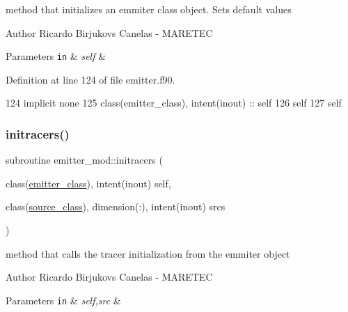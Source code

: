 method that initializes an emmiter class object. Sets default values 

\begin{DoxyAuthor}{Author}
Ricardo Birjukovs Canelas -\/ M\+A\+R\+E\+T\+EC
\end{DoxyAuthor}

\begin{DoxyParams}[1]{Parameters}
\mbox{\tt in}  & {\em self} & \\
\hline
\end{DoxyParams}


Definition at line 124 of file emitter.\+f90.


\begin{DoxyCode}
124     \textcolor{keywordtype}{implicit none}
125     \textcolor{keywordtype}{class}(emitter\_class), \textcolor{keywordtype}{intent(inout)} :: self
126     self%
127     self%
\end{DoxyCode}
\mbox{\label{namespaceemitter__mod_ad89dfc083eae7362441c353225a74ebc}} 
\subsubsection{\texorpdfstring{initracers()}{initracers()}}
{\footnotesize\ttfamily subroutine emitter\+\_\+mod\+::initracers (\begin{DoxyParamCaption}\item[{class(\mbox{\hyperlink{structemitter__mod_1_1emitter__class}{emitter\+\_\+class}}), intent(inout)}]{self,  }\item[{class(\mbox{\hyperlink{structsources__mod_1_1source__class}{source\+\_\+class}}), dimension(\+:), intent(inout)}]{srcs }\end{DoxyParamCaption})\hspace{0.3cm}{\ttfamily [private]}}



method that calls the tracer initialization from the emmiter object 

\begin{DoxyAuthor}{Author}
Ricardo Birjukovs Canelas -\/ M\+A\+R\+E\+T\+EC
\end{DoxyAuthor}

\begin{DoxyParams}[1]{Parameters}
\mbox{\tt in}  & {\em self,src} & \\
\hline
\end{DoxyParams}


